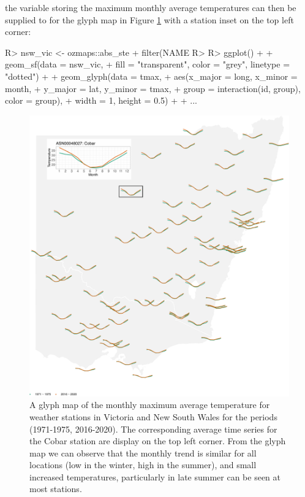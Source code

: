 \documentclass[
]{jss}
\begin{document}
the variable storing the maximum monthly average temperatures  can then be supplied to  for the glyph map in Figure \ref{fig:basic-manip} with a station inset on the top left corner:

\begin{CodeChunk}
\begin{CodeInput}
R> nsw_vic <- ozmaps::abs_ste %
+   filter(NAME %
R> 
R> ggplot() +
+   geom_sf(data = nsw_vic,
+           fill = "transparent", color = "grey", linetype = "dotted") +
+   geom_glyph(data = tmax,
+              aes(x_major = long, x_minor = month,
+                  y_major = lat, y_minor = tmax,
+                  group = interaction(id, group), color = group),
+              width = 1, height = 0.5) +
+   ...
\end{CodeInput}
\end{CodeChunk}

\begin{CodeChunk}
\begin{figure}

{\centering \includegraphics{figures/basic-manip-1} 

}

\caption[A glyph map of the monthly maximum average temperature for weather stations in  Victoria and New South Wales for the periods (1971-1975, 2016-2020)]{A glyph map of the monthly maximum average temperature for weather stations in  Victoria and New South Wales for the periods (1971-1975, 2016-2020). The corresponding average time series for the Cobar station are display on the top left corner. From the glyph map we can observe that the monthly trend is similar for all locations (low in the winter, high in the summer), and small increased temperatures, particularly in late summer can be seen at most stations.}\label{fig:basic-manip}
\end{figure}
\end{CodeChunk}
\end{document}
